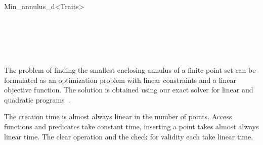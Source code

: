 \begin{ccRefClass}{Min_annulus_d<Traits>}
\begin{ccIndexMemberFunctions}
\end{ccIndexMemberFunctions}

\begin{ccIndexGlobalFunctions}



\end{ccIndexGlobalFunctions}

\ccSeeAlso

\\[1ex]
\\
\\
\\[1ex]

\ccImplementation
\ccIndexImplementation

The problem of finding the smallest enclosing annulus of a finite point set
can be formulated as an optimization problem with linear constraints and a
linear objective
function.
The solution is obtained using our exact
solver for linear and quadratic programs~\cite{gs-eegqp-00}.

The creation time is almost always linear in the number of points.  Access
functions and predicates take constant time, inserting a point takes almost
always linear time. The clear operation and the check for validity each
take linear time.


\ccRestoreThreeColumns

\end{ccRefClass}


